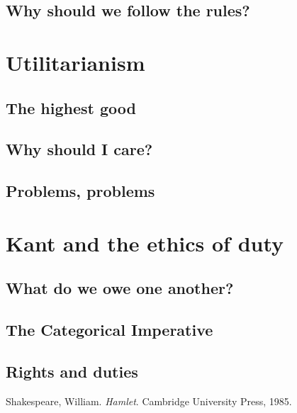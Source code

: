 \documentclass[justified]{tufte-book}
\begin{document}
\hypertarget{why-should-we-follow-the-rules}{%
\section{Why should we follow the rules?}\label{why-should-we-follow-the-rules}}

\hypertarget{utilitarianism}{%
\chapter{Utilitarianism}\label{utilitarianism}}

\hypertarget{the-highest-good}{%
\section{The highest good}\label{the-highest-good}}

\hypertarget{why-should-i-care}{%
\section{Why should I care?}\label{why-should-i-care}}

\hypertarget{problems-problems}{%
\section{Problems, problems}\label{problems-problems}}

\hypertarget{kant-and-the-ethics-of-duty}{%
\chapter{Kant and the ethics of duty}\label{kant-and-the-ethics-of-duty}}

\hypertarget{what-do-we-owe-one-another}{%
\section{What do we owe one another?}\label{what-do-we-owe-one-another}}

\hypertarget{the-categorical-imperative}{%
\section{The Categorical Imperative}\label{the-categorical-imperative}}

\hypertarget{rights-and-duties}{%
\section{Rights and duties}\label{rights-and-duties}}

\hypertarget{refs}{}
\leavevmode\hypertarget{ref-shakespeareHamlet1985}{}%
Shakespeare, William. \emph{Hamlet}. Cambridge University Press, 1985.
\end{document}
